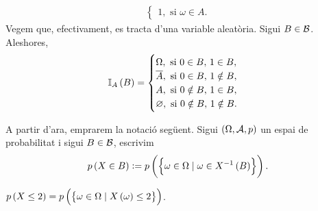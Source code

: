 \begin{example}
\begin{enumerate}[1.]
\begin{align*}
\begin{cases}
                    1, \text{ si } \omega\in A.
                \end{cases}
            \end{align*}
            Vegem que, efectivament, es tracta d'una variable aleatòria. Sigui $B\in\mathcal{B}$. Aleshores,
            \[
                \mathbb{I}_A\left( B\right)=\begin{cases}
                    \Omega, \text{ si } 0\in B,\, 1\in B,\\
                    \overline{A}, \text{ si } 0\in B,\, 1\notin B,\\
                    A, \text{ si } 0\notin B,\, 1\in B,\\
                    \varnothing, \text{ si } 0\notin B,\, 1\notin B.
                \end{cases}
            \]
    \end{enumerate}
\end{example}

\begin{obs}
    A partir d'ara, emprarem la notació següent. Sigui $(\Omega,\mathcal{A}, p)$ un espai de probabilitat i sigui $B\in\mathcal{B}$, escrivim
    \[
        p\left( X\in B\right):= p\left(\left\{\omega\in\Omega\mid\omega\in X^{-1}\left( B\right)\right\}\right).
    \]
\end{obs}

\begin{example}
    $p\left( X\leq 2\right) = p\left(\left\{\omega\in\Omega\mid X\left(\omega\right)\leq 2\right\}\right)$.
\end{example}

